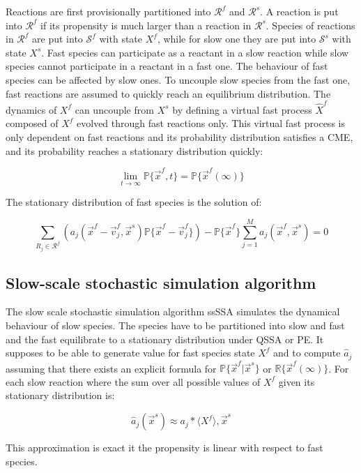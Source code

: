     Reactions are first provisionally partitioned into $\mathcal{R}^f$ and $\mathcal{R}^s$.
    A reaction is put into $\mathcal{R}^f$ if its propensity is much larger than a reaction in $\mathcal{R}^s$.
    Species of reactions in $\mathcal{R}^f$ are put into $\mathcal{S}^f$ with state $X^f$, while for slow one they are put into $\mathcal{S}^s$ with state $X^s$.
    Fast species can participate as a reactant in a slow reaction while slow species cannot participate in a reactant in a fast one.
    The behaviour of fast species can be affected by slow ones.
    To uncouple slow species from the fast one, fast reactions are assumed to quickly reach an equilibrium distribution.
    The dynamics of $X^f$ can uncouple from $X^s$ by defining a virtual fast process $\hat{X}^f$ composed of $X^f$ evolved through fast reactions only.
    This virtual fast process is only dependent on fast reactions and its probability distribution satisfies a CME, and its probability reaches a stationary distribution quickly:

    $$\lim\limits_{t\rightarrow\infty}\mathbb{P}\{\vec{x}^f, t\} = \mathbb{P}\{\vec{x}^f(\infty)\}$$

    The stationary distribution of fast species is the solution of:

    $$\sum\limits_{R_j\in\mathcal{R}^f}(a_j(\vec{x}^f-\vec{v}_j^f, \vec{x}^s)\mathbb{P}\{\vec{x}^f-\vec{v}_j^f\})-\mathbb{P}\{\vec{x}^f\}\sum\limits_{j=1}^Ma_j(\vec{x}^f,\vec{x}^s) = 0$$

  \subsection{Slow-scale stochastic simulation algorithm}
  The slow scale stochastic simulation algorithm ssSSA simulates the dynamical behaviour of slow species.
  The species have to be partitioned into slow and fast and the fast equilibrate to a stationary distribution under QSSA or PE.
  It supposes to be able to generate value for fast species state $X^f$ and to compute $\hat{a}_j$ assuming that there exists an explicit formula for $\mathbb{P}\{\vec{x}^f|\vec{x}^s\}$ or $\mathbb{R}\{\vec{x}^f(\infty)\}$.
  For each slow reaction where the sum over all possible values of $X^f$ given its stationary distribution is:

  $$\hat{a}_j(\vec{x}^s)\approx a_j*\langle X^f\rangle, \vec{x}^s$$

  This approximation is exact it the propensity is linear with respect to fast species.

